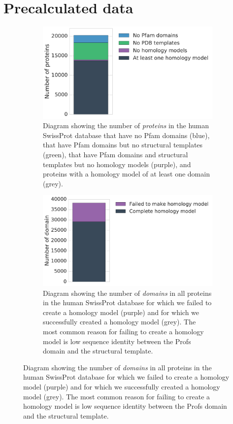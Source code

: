 




\section{Precalculated data}

\begin{figure}[!tb]
	\centering

	\begin{subfigure}[t]{0.48\textwidth}
		\centering
		\includegraphics[width=1\linewidth]{static/elaspic_training_set/elaspic_statistics/protein_statistics.pdf}
		\caption{Diagram showing the number of \textit{proteins} in the human SwissProt database that have no Pfam domains (blue), that have Pfam domains but no structural templates (green), that have Pfam domains and structural templates but no homology models (purple), and proteins with a homology model of at least one domain (grey).}
	\end{subfigure}%
	\hspace*{5mm}
	\begin{subfigure}[t]{0.48\textwidth}
		\centering
		\includegraphics[width=1\linewidth]{static/elaspic_training_set/elaspic_statistics/domain_statistics.pdf}
		\caption{Diagram showing the number of \textit{domains} in all proteins in the human SwissProt database for which we failed to create a homology model (purple) and for which we successfully created a homology model (grey). The most common reason for failing to create a homology model is low sequence identity between the Profs domain and the structural template.}
	\end{subfigure}
	\vspace*{10mm}


\end{figure}
